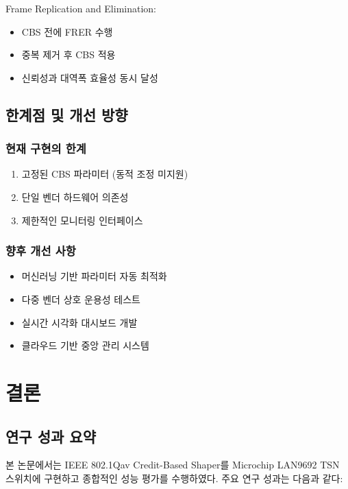 \documentclass[twocolumn,10pt]{article}
\begin{document}
Frame Replication and Elimination:

\begin{itemize}
    \item CBS 전에 FRER 수행
    \item 중복 제거 후 CBS 적용
    \item 신뢰성과 대역폭 효율성 동시 달성
\end{itemize}

\subsection{한계점 및 개선 방향}

\subsubsection{현재 구현의 한계}

\begin{enumerate}
    \item 고정된 CBS 파라미터 (동적 조정 미지원)
    \item 단일 벤더 하드웨어 의존성
    \item 제한적인 모니터링 인터페이스
\end{enumerate}

\subsubsection{향후 개선 사항}

\begin{itemize}
    \item 머신러닝 기반 파라미터 자동 최적화
    \item 다중 벤더 상호 운용성 테스트
    \item 실시간 시각화 대시보드 개발
    \item 클라우드 기반 중앙 관리 시스템
\end{itemize}

\section{결론}
\label{sec:conclusion}

\subsection{연구 성과 요약}

본 논문에서는 IEEE 802.1Qav Credit-Based Shaper를 Microchip LAN9692 TSN 스위치에 구현하고 종합적인 성능 평가를 수행하였다. 주요 연구 성과는 다음과 같다:
\end{document}
